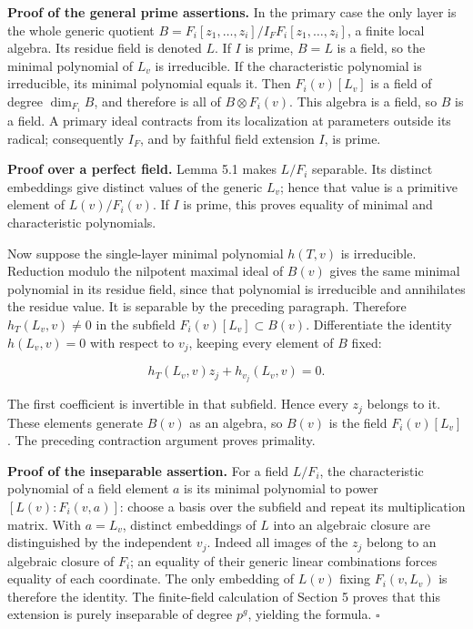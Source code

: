 \documentclass[
]{article}
\begin{document}
\textbf{Proof of the general prime assertions.} In the primary case the
only layer is the whole generic quotient
\(B=F_i[z_1,\ldots,z_i]/I_FF_i[z_1,\ldots,z_i]\), a finite local
algebra. Its residue field is denoted \(L\). If \(I\) is prime, \(B=L\)
is a field, so the minimal polynomial of \(L_v\) is irreducible. If the
characteristic polynomial is irreducible, its minimal polynomial equals
it. Then \(F_i(v)[L_v]\) is a field of degree \(\dim_{F_i}B\), and
therefore is all of \(B\otimes F_i(v)\). This algebra is a field, so
\(B\) is a field. A primary ideal contracts from its localization at
parameters outside its radical; consequently \(I_F\), and by faithful
field extension \(I\), is prime.

\textbf{Proof over a perfect field.} Lemma 5.1 makes \(L/F_i\)
separable. Its distinct embeddings give distinct values of the generic
\(L_v\); hence that value is a primitive element of \(L(v)/F_i(v)\). If
\(I\) is prime, this proves equality of minimal and characteristic
polynomials.

Now suppose the single-layer minimal polynomial \(h(T,v)\) is
irreducible. Reduction modulo the nilpotent maximal ideal of \(B(v)\)
gives the same minimal polynomial in its residue field, since that
polynomial is irreducible and annihilates the residue value. It is
separable by the preceding paragraph. Therefore \(h_T(L_v,v)\ne0\) in
the subfield \(F_i(v)[L_v]\subset B(v)\). Differentiate the identity
\(h(L_v,v)=0\) with respect to \(v_j\), keeping every element of \(B\)
fixed:

\[
h_T(L_v,v)z_j+h_{v_j}(L_v,v)=0.
\]

The first coefficient is invertible in that subfield. Hence every
\(z_j\) belongs to it. These elements generate \(B(v)\) as an algebra,
so \(B(v)\) is the field \(F_i(v)[L_v]\). The preceding contraction
argument proves primality.

\textbf{Proof of the inseparable assertion.} For a field \(L/F_i\), the
characteristic polynomial of a field element \(a\) is its minimal
polynomial to power \([L(v):F_i(v,a)]\): choose a basis over the
subfield and repeat its multiplication matrix. With \(a=L_v\), distinct
embeddings of \(L\) into an algebraic closure are distinguished by the
independent \(v_j\). Indeed all images of the \(z_j\) belong to an
algebraic closure of \(F_i\); an equality of their generic linear
combinations forces equality of each coordinate. The only embedding of
\(L(v)\) fixing \(F_i(v,L_v)\) is therefore the identity. The
finite-field calculation of Section 5 proves that this extension is
purely inseparable of degree \(p^g\), yielding the formula. \(\square\)
\end{document}
